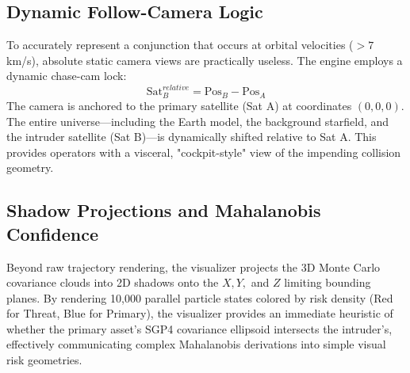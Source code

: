 \subsection{Dynamic Follow-Camera Logic}
To accurately represent a conjunction that occurs at orbital velocities ($>7$ km/s), absolute static camera views are practically useless. The engine employs a dynamic chase-cam lock:
\begin{equation}
    \text{Sat}_B^{relative} = \text{Pos}_B - \text{Pos}_A
\end{equation}
The camera is anchored to the primary satellite (Sat A) at coordinates $(0,0,0)$. The entire universe---including the Earth model, the background starfield, and the intruder satellite (Sat B)---is dynamically shifted relative to Sat A. This provides operators with a visceral, "cockpit-style" view of the impending collision geometry.

\subsection{Shadow Projections and Mahalanobis Confidence}
Beyond raw trajectory rendering, the visualizer projects the 3D Monte Carlo covariance clouds into 2D shadows onto the $X, Y,$ and $Z$ limiting bounding planes. By rendering 10,000 parallel particle states colored by risk density (Red for Threat, Blue for Primary), the visualizer provides an immediate heuristic of whether the primary asset's SGP4 covariance ellipsoid intersects the intruder's, effectively communicating complex Mahalanobis derivations into simple visual risk geometries.

